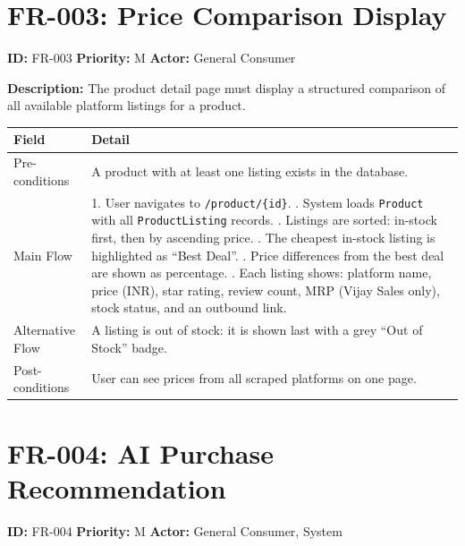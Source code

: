 \documentclass[12pt,a4paper]{report}
\begin{document}
\section{FR-003: Price Comparison Display}

\begin{reqbox}
\textbf{ID:} FR-003 \quad \textbf{Priority:} M \quad \textbf{Actor:} General Consumer
\end{reqbox}

\textbf{Description:} The product detail page must display a structured
comparison of all available platform listings for a product.

\begin{longtable}{L{3cm} L{10cm}}
  \toprule
  \textbf{Field} & \textbf{Detail} \\
  \midrule
  \endhead
  Pre-conditions & A product with at least one listing exists in the database. \\[3pt]
  Main Flow &
    1. User navigates to \texttt{/product/\{id\}}. . System loads \texttt{Product} with all \texttt{ProductListing} records. . Listings are sorted: in-stock first, then by ascending price. . The cheapest in-stock listing is highlighted as ``Best Deal''. . Price differences from the best deal are shown as percentage. . Each listing shows: platform name, price (INR), star rating,
       review count, MRP (Vijay Sales only), stock status, and an
       outbound link. \\[3pt]
  Alternative Flow &
    A listing is out of stock: it is shown last with a grey ``Out of Stock'' badge. \\[3pt]
  Post-conditions & User can see prices from all scraped platforms on one page. \\
  \bottomrule
\end{longtable}

\section{FR-004: AI Purchase Recommendation}

\begin{reqbox}
\textbf{ID:} FR-004 \quad \textbf{Priority:} M \quad \textbf{Actor:} General Consumer, System
\end{reqbox}
\end{document}
